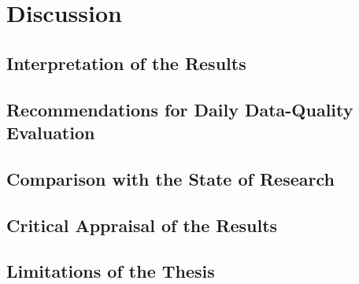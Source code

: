 \chapter{Discussion}
\label{kap:Diskussion}

\section{Interpretation of the Results}
\label{sec:Diskussion_Interpretation}

\section{Recommendations for Daily Data-Quality Evaluation}
\label{sec:Diskussion_Recommendations}

\section{Comparison with the State of Research}
\label{sec:Diskussion_StateOfResearch}

\section{Critical Appraisal of the Results}
\label{sec:Diskussion_Appraisal}

\section{Limitations of the Thesis}
\label{sec:Diskussion_Limitations}

